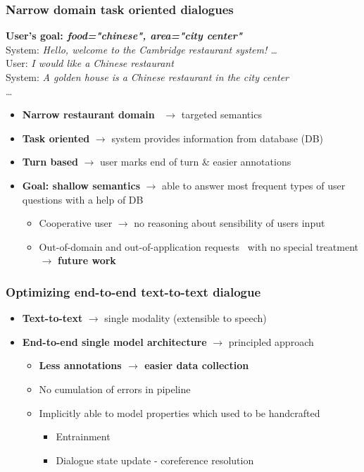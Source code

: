\documentclass[10pt, compress,british,xcolor={svgnames,dvipsnames,x11names},trans]{beamer}
\def\sys#1{{\color{purple}System: \it #1}}
\def\usr#1{{\color{brown}User: \it #1}}
\begin{document}
\begin{frame}\frametitle{Narrow domain task oriented dialogues}
    {\bf User's goal: {\it food="chinese", area="city center"}} \\
    \vfill
    \sys{Hello, welcome to the Cambridge restaurant system! \dots } \\
    \usr{I would like a Chinese restaurant} \\
    \sys{A golden house is a Chinese restaurant in the city center} \\
    \dots

    \begin{itemize}
        \item {\bf Narrow restaurant domain}~\cite{henderson2014second} $\longrightarrow$ targeted semantics
        \item {\bf Task oriented} $\longrightarrow$ system provides information from database (DB)
        \item {\bf Turn based} $\longrightarrow$ user marks end of turn \& easier annotations
        \item {\bf Goal: shallow semantics} $\longrightarrow$ able to answer most frequent types of user questions with a help of DB
            \begin{itemize}
                \item Cooperative user $\longrightarrow$ no reasoning about sensibility of users input   
                \item {\color{darkgreen} Out-of-domain and out-of-application requests~\cite{bohus2007error} with no special treatment} $\longrightarrow$ {\color{red} {\bf future work}}
            \end{itemize}
    \end{itemize}
\end{frame}

\begin{frame}\frametitle{Optimizing end-to-end text-to-text dialogue}
    \begin{itemize}
        \item {\bf Text-to-text} $\longrightarrow$ single modality (extensible to speech)
        \item {\bf End-to-end single model architecture} $\longrightarrow$ principled approach
            \begin{itemize}
                \item {\bf Less annotations $\longrightarrow$ easier data collection}
                \item No cumulation of errors in pipeline
                \item Implicitly able to model properties which used to be handcrafted 
                \begin{itemize}
                    \item Entrainment
                    \item Dialogue state update - coreference resolution
                \end{itemize}
            \end{itemize}
    \end{itemize}
\end{frame}
\end{document}
